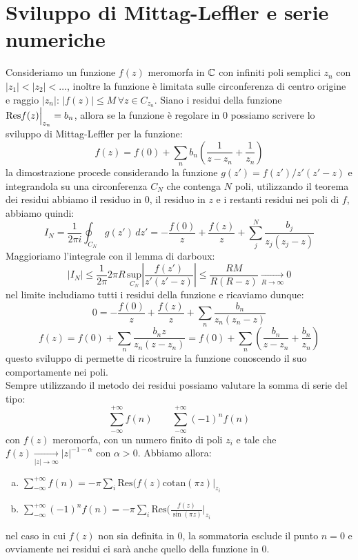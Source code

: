 \section{Sviluppo di Mittag-Leffler e serie numeriche}
Consideriamo un funzione $f(z)$ meromorfa in $\mathbb{C}$ con infiniti poli semplici $z_n$ con $|z_1|<|z_2|<\dots$, inoltre la funzione è limitata sulle circonferenza di centro origine e raggio $|z_n|$: $|f(z)|\leq M\, \forall z\in C_{z_n}$. Siano i residui della funzione $\text{Res}f(z)\Big|_{z_n} = b_n$, allora se la funzione è regolare in 0 possiamo scrivere lo sviluppo di Mittag-Leffler per la funzione:
\[f(z) = f(0) + \sum_n b_n \left(\frac{1}{z-z_n} + \frac{1}{z_n}\right)\]
la dimostrazione procede considerando la funzione $g(z') = f(z')/z'(z'-z)$ e integrandola su una circonferenza $C_N$ che contenga $N$ poli, utilizzando il teorema dei residui abbiamo il residuo in 0, il residuo in $z$ e i restanti residui nei poli di $f$, abbiamo quindi:
\[I_N = \frac{1}{2\pi i}\oint_{C_N} g(z')\,dz' = -\frac{f(0)}{z} + \frac{f(z)}{z} + \sum_j^N \frac{b_j}{z_j(z_j-z)}\]
Maggioriamo l'integrale con il lemma di darboux:
\[|I_N| \leq \frac{1}{2\pi}2\pi R\, \underset{C_N}{\text{sup}}\left|\frac{f(z')}{z'(z'-z)}\right|\leq \frac{RM}{R(R-z)}\xrightarrow[R\to \infty]{} 0  \]
nel limite includiamo tutti i residui della funzione e ricaviamo dunque:
\[0 = -\frac{f(0)}{z} + \frac{f(z)}{z} + \sum_n \frac{b_n}{z_n(z_n-z)} \]
\[f(z) = f(0) + \sum_n \frac{b_nz}{z_n(z-z_n)} = f(0) + \sum_n\left(\frac{b_n}{z-z_n} + \frac{b_n}{z_n}\right) \]
questo sviluppo di permette di ricostruire la funzione conoscendo il suo comportamente nei poli.\\
\newline
Sempre utilizzando il metodo dei residui possiamo valutare la somma di serie del tipo:
\[\sum_{-\infty}^{+\infty}f(n)\qquad \sum_{-\infty}^{+\infty}(-1)^nf(n)\]
con $f(z)$ meromorfa, con un numero finito di poli $z_i$ e tale che $f(z) \xrightarrow[|z|\to \infty]{} |z|^{-1-\alpha}$ con $\alpha>0$.
Abbiamo allora:
\begin{enumerate}[a)]
\centering
\item$\displaystyle\sum_{-\infty}^{+\infty}f(n) = -\pi \displaystyle\sum_i \text{Res}(f(z)\text{cotan}(\pi z)\Big|_{z_i}$
\item $\displaystyle\sum_{-\infty}^{+\infty}(-1)^nf(n) = -\pi \sum_i \text{Res}\bigg(\frac{f(z)}{\sin(\pi z)}\bigg|_{z_i}$
\end{enumerate}
nel caso in cui $f(z)$ non sia definita in 0, la sommatoria esclude il punto $n=0$ e ovviamente nei residui ci sarà anche quello della funzione in 0.\\
